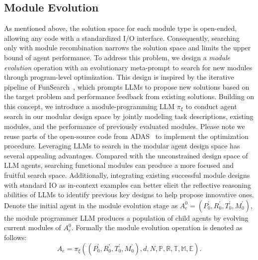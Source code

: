 \subsection{Module Evolution}
As mentioned above, the solution space for each module type is open-ended, allowing any code with a standardized I/O interface. 
Consequently, searching only with module recombination narrows the solution space and limits the upper bound of agent performance.
To address this problem, we design a \emph{module evolution} operation with an evolutionary meta-prompt to search for new modules through program-level optimization.
This design is inspired by the iterative pipeline of FunSearch~\citep{romera2024mathematical}, which prompts LLMs to propose new solutions based on the target problem and performance feedback from existing solutions. 
Building on this concept, we introduce a module-programming LLM $\pi_{\xi}$ to conduct agent search in our modular design space by jointly modeling task descriptions, existing modules, and the performance of previously evaluated modules. Please note we reuse parts of the open-source code from ADAS~\citep{hu2024automated} to implement the optimization procedure.
Leveraging LLMs to search in the modular agent design space has several appealing advantages. 
Compared with the unconstrained design space of LLM agents, searching functional modules can produce a more focused and fruitful search space.
Additionally, integrating existing successful module designs with standard IO as in-context examples can better elicit the reflective reasoning abilities of LLMs to identify previous key designs to help propose innovative ones.
Denote the initial agent in the module evolution stage as $A_e^0 = (P^{'}_0,R^{'}_0,T^{'}_0,M^{'}_0)$, the module programmer LLM produces a population of child agents by evolving current modules of $A_e^0$.
Formally the module evolution operation is denoted as follows:
\begin{equation}
    A_e = \pi_{\xi}((P^{'}_0,R^{'}_0,T^{'}_0,M^{'}_0), d, N, \mathbb{P}, \mathbb{R}, \mathbb{T}, \mathbb{M}, \mathbb{E}).
\end{equation}


